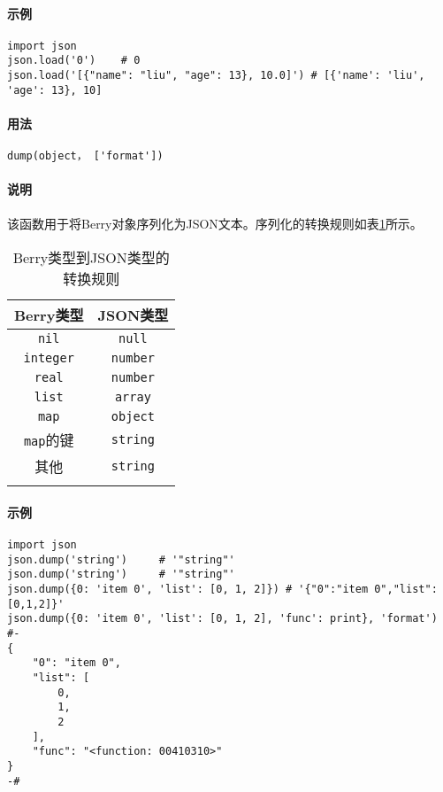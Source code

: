 \paragraph{示例}
\begin{lstlisting}[language=berry, numbers=none]
import json
json.load('0')    # 0
json.load('[{"name": "liu", "age": 13}, 10.0]') # [{'name': 'liu', 'age': 13}, 10]
\end{lstlisting}


\paragraph{用法}
\begin{lstlisting}[language=berry, numbers=none]
dump(object， ['format'])
\end{lstlisting}

\paragraph{说明}
该函数用于将Berry对象序列化为JSON文本。序列化的转换规则如表\ref{tab::berry2json_rule}所示。
\begin{table}[htb]
    \centering
    \setlength{\tabcolsep}{18mm}
    \begin{tabular}{cc} \Xhline{1pt}
        \textbf{Berry类型} & \textbf{JSON类型} \\ \hline
        \texttt{nil} & \texttt{null} \\
        \texttt{integer} & \texttt{number} \\
        \texttt{real} & \texttt{number} \\
        \texttt{list} & \texttt{array} \\
        \texttt{map} & \texttt{object} \\
        \texttt{map}的键 & \texttt{string} \\
        其他 & \texttt{string} \\
        \Xhline{1pt}
    \end{tabular}
    \caption{Berry类型到JSON类型的转换规则}
    \label{tab::berry2json_rule}
\end{table}

\paragraph{示例}
\begin{lstlisting}[language=berry, numbers=none]
import json
json.dump('string')     # '"string"'
json.dump('string')     # '"string"'
json.dump({0: 'item 0', 'list': [0, 1, 2]}) # '{"0":"item 0","list":[0,1,2]}'
json.dump({0: 'item 0', 'list': [0, 1, 2], 'func': print}, 'format')
#-
{
    "0": "item 0",
    "list": [
        0,
        1,
        2
    ],
    "func": "<function: 00410310>"
}
-#
\end{lstlisting}

